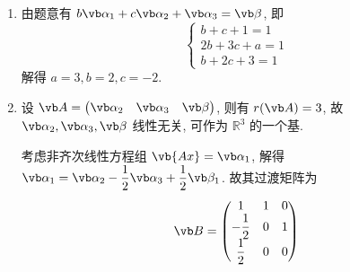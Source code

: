 \begin{enumerate}
\item 由题意有 $b\vb\alpha_1+c\vb \alpha_2+\vb \alpha_3=\vb\beta$, 即
\[
	\left\{
\begin{aligned}
b+c+1=1\\
2b+3c+a=1\\
b+2c+3=1
\end{aligned}
	\right.
\]
解得 $a=3,b=2,c=-2$.

\item 设 $\vb A=\begin{pmatrix}\vb\alpha_2&\vb\alpha_3&\vb\beta\end{pmatrix}$, 则有 $r(\vb A)=3$, 故 $\vb\alpha_2,\vb\alpha_3,\vb\beta$ 线性无关, 可作为 $\mathbb{R}^3$ 的一个基.

考虑非齐次线性方程组 $\vb{Ax}=\vb\alpha_1$, 解得 $\vb\alpha_1=\vb\alpha_2-\dfrac{1}{2}\vb\alpha_3+\dfrac{1}{2}\vb \beta_1$. 故其过渡矩阵为
\[
	\vb B=\begin{pmatrix}1&1&0\\ -\dfrac{1}{2}&0&1\\ \dfrac{1}{2}&0&0\end{pmatrix}
\] 
\end{enumerate}